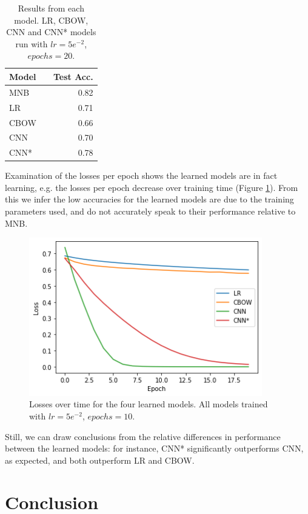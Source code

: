 \documentclass[11pt]{article}
\begin{document}
\begin{table}[h]
  \centering
  \begin{tabular}{llr}
   \toprule
   Model &  & Test Acc. \\
   \midrule
   \textsc{MNB} & & 0.82\\
   \textsc{LR} & & 0.71\\
   \textsc{CBOW} & & 0.66 \\
   \textsc{CNN} & & 0.70 \\
   \textsc{CNN*} & & 0.78 \\
   \bottomrule
  \end{tabular}
  \caption{\label{tab:results} Results from each model. LR, CBOW, CNN and CNN* models run with $lr=5e^{-2}$, $epochs=20$.}
  \end{table}

Examination of the losses per epoch shows the learned models are in fact learning, e.g. the losses per epoch decrease over training time (Figure \ref{fig:losses}). From this we infer the low accuracies for the learned models are due to the training parameters used, and do not accurately speak to their performance relative to MNB.

\begin{figure}[h]
  \centering
  \includegraphics[width=4in]{losses.png}
  \caption{\label{fig:losses} Losses over time for the four learned models. All models trained with $lr=5e^{-2}$, $epochs=10$.}
\end{figure}

Still, we can draw conclusions from the relative differences in performance between the learned models: for instance, CNN* significantly outperforms CNN, as expected, and both outperform LR and CBOW.

\section{Conclusion}
\end{document}

